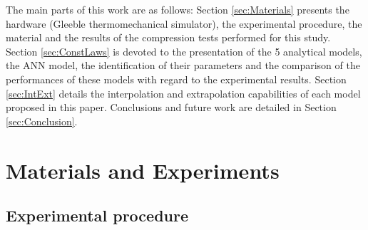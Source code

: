 \documentclass[twoside,english,1p,final,sort&compress]{elsarticle}
\theoremstyle{plain}
\begin{document}
The main parts of this work are as follows: Section \ref{sec:Materials} presents the hardware (Gleeble thermomechanical simulator), the experimental procedure, the material and the results of the compression tests performed for this study.
Section \ref{sec:ConstLaws} is devoted to the presentation of the 5 analytical models, the ANN model, the identification of their parameters and the comparison of the performances of these models with regard to the experimental results.
Section \ref{sec:IntExt} details the interpolation and extrapolation capabilities of each model proposed in this paper.
Conclusions and future work are detailed in Section \ref{sec:Conclusion}.

\section{Materials and Experiments\label{sec:Materials}}

\subsection{Experimental procedure}
\end{document}
